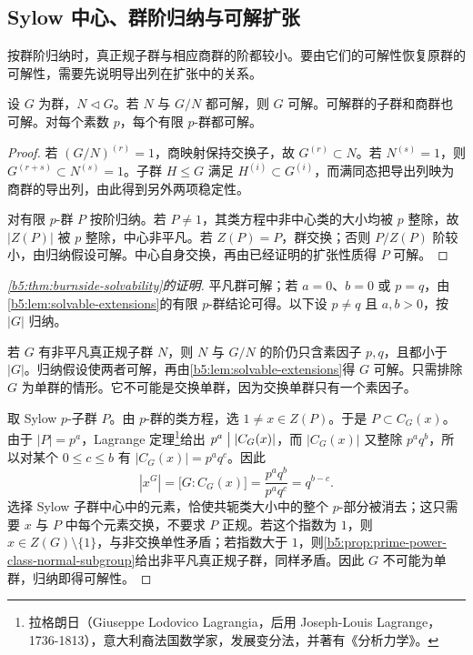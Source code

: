 \subsection{Sylow 中心、群阶归纳与可解扩张}
\label{b5:subsec:0505:04}

按群阶归纳时，真正规子群与相应商群的阶都较小。要由它们的可解性恢复原群的可解性，需要先说明导出列在扩张中的关系。
\begin{lemma}\label{b5:lem:solvable-extensions}
	设 \(G\) 为群，\(N\triangleleft G\)。若 \(N\) 与 \(G/N\) 都可解，则 \(G\) 可解。可解群的子群和商群也可解。对每个素数 \(p\)，每个有限 \(p\)-群都可解。
\end{lemma}
\begin{proof}
	若 \((G/N)^{(r)}=1\)，商映射保持交换子，故 \(G^{(r)}\subset N\)。若 \(N^{(s)}=1\)，则 \(G^{(r+s)}\subset N^{(s)}=1\)。子群 \(H\le G\) 满足 \(H^{(i)}\subset G^{(i)}\)，而满同态把导出列映为商群的导出列，由此得到另外两项稳定性。

	对有限 \(p\)-群 \(P\) 按阶归纳。若 \(P\ne1\)，其类方程中非中心类的大小均被 \(p\) 整除，故 \(|Z(P)|\) 被 \(p\) 整除，中心非平凡。若 \(Z(P)=P\)，群交换；否则 \(P/Z(P)\) 阶较小，由归纳假设可解。中心自身交换，再由已经证明的扩张性质得 \(P\) 可解。
\end{proof}

\begin{proof}[\cref{b5:thm:burnside-solvability}的证明]
	平凡群可解；若 \(a=0\)、\(b=0\) 或 \(p=q\)，由\cref{b5:lem:solvable-extensions}的有限 \(p\)-群结论可得。以下设 \(p\ne q\) 且 \(a,b>0\)，按 \(|G|\) 归纳。

	若 \(G\) 有非平凡真正规子群 \(N\)，则 \(N\) 与 \(G/N\) 的阶仍只含素因子 \(p,q\)，且都小于 \(|G|\)。归纳假设使两者可解，再由\cref{b5:lem:solvable-extensions}得 \(G\) 可解。只需排除 \(G\) 为单群的情形。它不可能是交换单群，因为交换单群只有一个素因子。

	取 Sylow \(p\)-子群 \(P\)。由 \(p\)-群的类方程，选 \(1\ne x\in Z(P)\)。于是 \(P\subset C_G(x)\)。由于 \(|P|=p^a\)，Lagrange 定理\footnote{拉格朗日（Giuseppe Lodovico Lagrangia，后用 Joseph-Louis Lagrange，1736-1813），意大利裔法国数学家，发展变分法，并著有《分析力学》。}给出 \(p^a\bigm\vert |C_G(x)|\)，而 \(|C_G(x)|\) 又整除 \(p^aq^b\)，所以对某个 \(0\le c\le b\) 有 \(|C_G(x)|=p^aq^c\)。因此
	\[
		|x^G|=\bigl[G:C_G(x)\bigr] =\frac{p^aq^b}{p^aq^c}=q^{b-c}.
	\]
	选择 Sylow 子群中心中的元素，恰使共轭类大小中的整个 \(p\)-部分被消去；这只需要 \(x\) 与 \(P\) 中每个元素交换，不要求 \(P\) 正规。若这个指数为 \(1\)，则 \(x\in Z(G)\setminus\{1\}\)，与非交换单性矛盾；若指数大于 \(1\)，则\cref{b5:prop:prime-power-class-normal-subgroup}给出非平凡真正规子群，同样矛盾。因此 \(G\) 不可能为单群，归纳即得可解性。
\end{proof}

